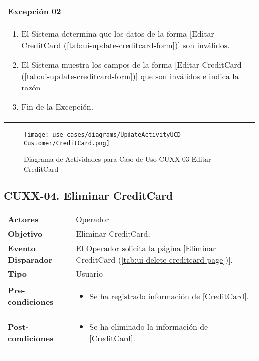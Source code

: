 	\begin{tabular}{ p{15.5cm} }
		\textbf{Excepci\'on 02} \\
		\begin{enumerate}
			\item El Sistema determina que los datos de la forma [Editar CreditCard (\ref{tab:ui-update-creditcard-form})] son inv\'alidos.
			\item El Sistema muestra los campos de la forma [Editar CreditCard (\ref{tab:ui-update-creditcard-form})] que son inv\'alidos e indica la raz\'on.
			\item Fin de la Excepci\'on.
		\end{enumerate}
	\end{tabular}
	
	\begin{figure}[H]
		\begin{center}
		 \label{tab:activity-update-ucd-entity-creditcard}
		 \texttt{[image: use-cases/diagrams/UpdateActivityUCD-Customer/CreditCard.png]}
		 \caption{Diagrama de Actividades para Caso de Uso CUXX-03 Editar CreditCard}
		\end{center}
	\end{figure}
	
	\clearpage
	\subsection{CUXX-04. Eliminar CreditCard} \label{sec:cu-delete-CreditCard}
	
	\begin{tabular}{ p{3.5cm} p{11.5cm} }
		\textbf{Actores} & Operador\\
		\textbf{Objetivo} & Eliminar CreditCard.\\
		\textbf{Evento Disparador} & El Operador solicita la p\'agina [Eliminar CreditCard (\ref{tab:ui-delete-creditcard-page})].\\
		\textbf{Tipo} & Usuario\\
		\textbf{Pre-condiciones} &
			\begin{minipage}[t]{0.6\textwidth}
			\begin{itemize}[noitemsep,nolistsep]
			\setlength{\itemindent}{-.5cm}
				\item Se ha registrado informaci\'on de [CreditCard].
			\end{itemize}
			\end{minipage} \\
		\textbf{Post-condiciones} &
			\begin{minipage}[t]{0.6\textwidth}
			\begin{itemize}[noitemsep,nolistsep]
			\setlength{\itemindent}{-.5cm}
				\item Se ha eliminado la informaci\'on de [CreditCard].
			\end{itemize}
			\end{minipage} \\
		\\
	\end{tabular}
	
